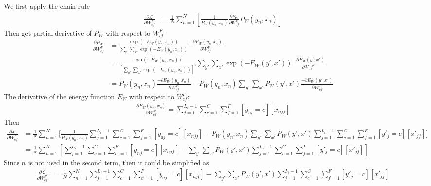 \documentclass[11pt]{article}
\begin{document}
\begin{problem}{34}
We first apply the chain rule
\begin{align*}
\frac{\partial\mathcal{L}}{\partial W_{cf}^F} &= \frac{1}{N}\sum_{n=1}^N\left[\frac{1}{P_W(y_n,x_n)}\frac{\partial P_W}{\partial W_{cf}^F}P_W(y_n,x_n)\right]
\end{align*}
Then get partial derivative of $P_W$ with respect to $W_{cf}^F$
\begin{align*}
\frac{\partial P_W}{\partial W_{cf}^F} &= 
\frac{\exp(-E_W(y_n,x_n))}{\sum_{y'}\sum_{x'}\exp(-E_W(y_n,x_n))}\frac{-\partial E_W(y_n,x_n)}{\partial W_{cf}^F}\\
&= \frac{\exp(-E_W(y_n,x_n))}{\left[\sum_{y'}\sum_{x'}\exp(-E_W(y_n,x_n))\right]^2}\sum_{y'}\sum_{x'}\exp(-E_W(y',x'))\frac{-\partial E_W(y',x')}{\partial W_cf^F}\\
&= 
P_W(y_n,x_n)\frac{-\partial E_W(y_n,x_n)}{\partial W_{cf}^F}
-P_W(y_n,x_n)\sum_{y'}\sum_{x'}P_W(y',x')\frac{-\partial E_W(y',x')}{\partial W_{cf}^F}
\end{align*}
The derivative of the energy function $E_W$ with respect to $W_{cf}^F$:
\begin{align*}
\frac{\partial E_W(y_n,x_n)}{\partial W_{cf}^F} = \sum_{j=1}^{L_i-1}\sum_{c=1}^C\sum_{f=1}^F[y_{nj}=c][x_{njf}]
\end{align*}
Then
\begin{align*}
\frac{\partial\mathcal{L}}{\partial W_{cf}^F} &= 
\frac{1}{N}\sum_{n=1}^N\Big[ 
\frac{1}{P_W(y_n,x_n)}\sum_{j=1}^{L_i-1}\sum_{c=1}^C\sum_{f=1}^F[y_{nj}=c][x_{njf}]-P_W(y_n,x_n)\sum_{y'}\sum_{x'}P_W(y',x')\sum_{j=1}^{L_i-1}\sum_{c=1}^C\sum_{f=1}^F[y'_{j}=c][x'_{jf}]
\Big]\\
&= \frac{1}{N}\sum_{n=1}^N\left[ 
\sum_{j=1}^{L_i-1}\sum_{c=1}^C\sum_{c'=1}^F[y_{nj}=c][x_{njf}]
-\sum_{y'}\sum_{x'}P_W(y',x')\sum_{j=1}^{L_i-1}\sum_{c=1}^C\sum_{f=1}^F[y'_{j}=c][x'_{jf}]
\right]
\end{align*}
Since $n$ is not used in the second term, then it could be simplified as
\begin{align*}
\frac{\partial\mathcal{L}}{\partial W_{cf}^F} &=
\frac{1}{N}\sum_{n=1}^N\sum_{j=1}^{L_i-1}\sum_{c=1}^C\sum_{c'=1}^F[y_{nj}=c][x_{njf}]
-\sum_{y'}\sum_{x'}P_W(y',x')\sum_{j=1}^{L_i-1}\sum_{c=1}^C\sum_{f=1}^F[y'_{j}=c][x'_{jf}]
\end{align*}


\end{problem}
\end{document}
